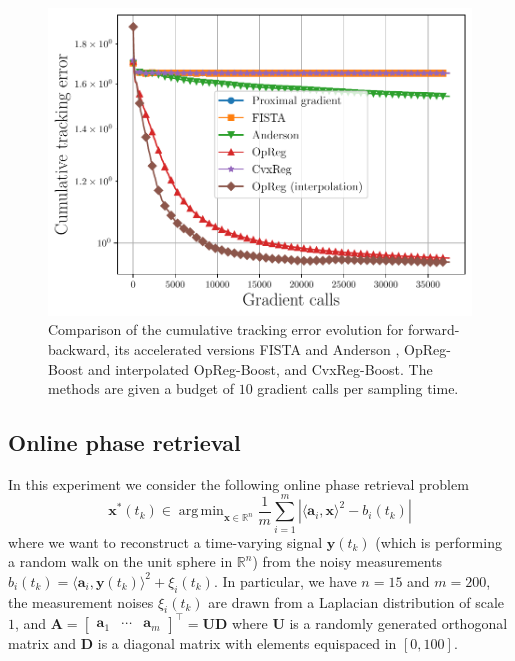 \documentclass{article}
\DeclareMathOperator*{\argmin}{arg\,min}
\newcommand{\R}{\mathbb{R}}
\newcommand{\av}{\mathbold{a}}
\newcommand{\x}{\mathbold{x}}
\newcommand{\y}{\mathbold{y}}
\newcommand{\Am}{\mathbold{A}}
\begin{document}
\begin{figure}[ht]
\vskip 0.2in
\begin{center}
\centerline{\includegraphics[width=\columnwidth]{Figures/lasso-operator_calls}}
\caption{Comparison of the cumulative tracking error evolution for forward-backward, its accelerated versions FISTA \cite{beck_fast_2009} and Anderson \cite{pmlr-v119-mai20a}, OpReg-Boost and interpolated OpReg-Boost, and CvxReg-Boost. The methods are given a budget of $10$ gradient calls per sampling time.}
\label{fig:lasso-operator_calls}
\end{center}
\vskip -0.2in
\end{figure}


\subsection{Online phase retrieval}
In this experiment we consider the following online phase retrieval problem \cite{duchi_stochastic_2018}
\begin{equation}\label{eq:phase-retrieval}
	\x^*(t_k) \in \argmin_{\x \in \R^n} \frac{1}{m} \sum_{i = 1}^{m} \left| \langle \av_i, \x \rangle^2 - b_i(t_k) \right|
\end{equation}
where we want to reconstruct a time-varying signal $\y(t_k)$ (which is performing a random walk on the unit sphere in $\R^n$) from the noisy measurements $b_i(t_k) = \langle \av_i, \y(t_k) \rangle^2 + \xi_i(t_k)$. In particular, we have $n = 15$ and $m = 200$, the measurement noises $\xi_i(t_k)$ are drawn from a Laplacian distribution of scale $1$, and $\Am = \begin{bmatrix} \av_1 & \cdots & \av_m \end{bmatrix}^\top = \mathbold{U} \mathbold{D}$ where $\mathbold{U}$ is a randomly generated orthogonal matrix and $\mathbold{D}$ is a diagonal matrix with elements equispaced in $[0, 100]$.
\end{document}
